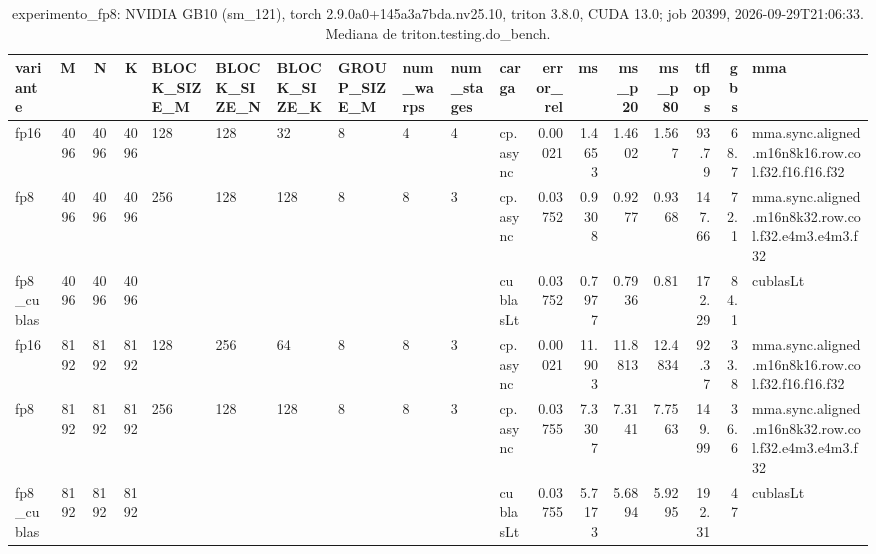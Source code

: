 \begin{table}[htbp]
  \centering\small
  \begin{tabular}{lrrrlllllllrrrrrrl}
    \toprule
    variante & M & N & K & BLOCK\_SIZE\_M & BLOCK\_SIZE\_N & BLOCK\_SIZE\_K & GROUP\_SIZE\_M & num\_warps & num\_stages & carga & error\_rel & ms & ms\_p20 & ms\_p80 & tflops & gbs & mma \\
    \midrule
    fp16 & 4096 & 4096 & 4096 & 128 & 128 & 32 & 8 & 4 & 4 & cp.async & 0.00021 & 1.4653 & 1.4602 & 1.567 & 93.79 & 68.7 & mma.sync.aligned.m16n8k16.row.col.f32.f16.f16.f32 \\
    fp8 & 4096 & 4096 & 4096 & 256 & 128 & 128 & 8 & 8 & 3 & cp.async & 0.03752 & 0.9308 & 0.9277 & 0.9368 & 147.66 & 72.1 & mma.sync.aligned.m16n8k32.row.col.f32.e4m3.e4m3.f32 \\
    fp8\_cublas & 4096 & 4096 & 4096 &  &  &  &  &  &  & cublasLt & 0.03752 & 0.7977 & 0.7936 & 0.81 & 172.29 & 84.1 & cublasLt \\
    fp16 & 8192 & 8192 & 8192 & 128 & 256 & 64 & 8 & 8 & 3 & cp.async & 0.00021 & 11.903 & 11.8813 & 12.4834 & 92.37 & 33.8 & mma.sync.aligned.m16n8k16.row.col.f32.f16.f16.f32 \\
    fp8 & 8192 & 8192 & 8192 & 256 & 128 & 128 & 8 & 8 & 3 & cp.async & 0.03755 & 7.3307 & 7.3141 & 7.7563 & 149.99 & 36.6 & mma.sync.aligned.m16n8k32.row.col.f32.e4m3.e4m3.f32 \\
    fp8\_cublas & 8192 & 8192 & 8192 &  &  &  &  &  &  & cublasLt & 0.03755 & 5.7173 & 5.6894 & 5.9295 & 192.31 & 47 & cublasLt \\
    \bottomrule
  \end{tabular}
  \caption{experimento\_fp8: NVIDIA GB10 (sm\_121), torch 2.9.0a0+145a3a7bda.nv25.10, triton 3.8.0, CUDA 13.0; job 20399, 2026-09-29T21:06:33. Mediana de triton.testing.do\_bench.}
  \label{tab:experimento-fp8}
\end{table}
